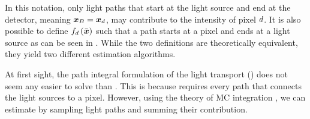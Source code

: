 \documentclass{article}
\begin{document}
In this notation, only light paths that start at the light source and end at the detector, meaning $\boldsymbol{x}_{B}=\boldsymbol{x}_{d}$, may contribute to the intensity of pixel $d$. It is also possible to define $f_{d}\left({\Bar{\boldsymbol{x}}}\right)$ such that a path starts at a pixel and ends at a light source as can be seen in \eqs{\ref{eq:g0K},\ref{eq:cont_func}}. While the two definitions are theoretically equivalent, they yield two different estimation algorithms.

At first sight, the path integral formulation of the light transport (\eqnopar{\ref{eq:cont_func}}) does not seem any easier to solve than \eq{\ref{eq:volume_rendering}}. This is because \eq{\ref{eq:cont_func}} requires every path that connects the light sources to a pixel. However, using the theory of  \ac{MC} integration \citep{veach1997robust}, we can estimate \eq{\ref{eq:cont_func}} by sampling light paths and summing their contribution. 

\end{document}

